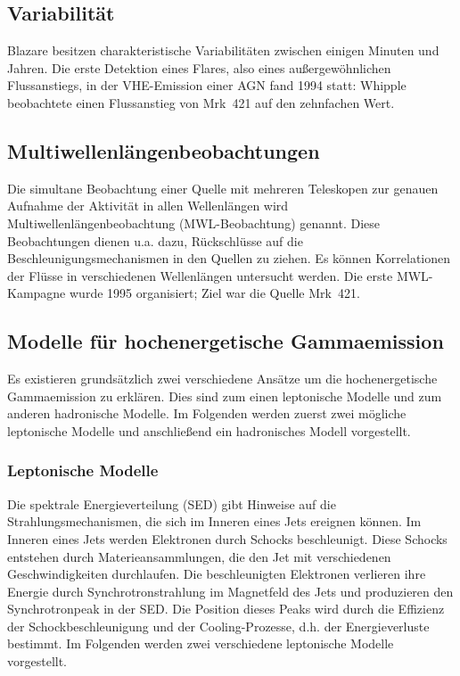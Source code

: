 \subsection{Variabilität}
Blazare besitzen charakteristische Variabilitäten zwischen einigen Minuten und Jahren.
Die erste Detektion eines Flares, also eines außergewöhnlichen Flussanstiegs, in der VHE-Emission einer AGN fand 1994 statt:
Whipple beobachtete einen Flussanstieg von Mrk~421 auf den zehnfachen Wert.\cite{Weekes}\cite{Mrk421_Outburst}

\subsection{Multiwellenlängenbeobachtungen}
Die simultane Beobachtung einer Quelle mit mehreren Teleskopen zur genauen Aufnahme der Aktivität in allen Wellenlängen wird Multiwellenlängenbeobachtung (MWL-Beobachtung) genannt. 
Diese Beobachtungen dienen u.a. dazu, Rückschlüsse auf die Beschleunigungsmechanismen in den Quellen zu ziehen.
Es können Korrelationen der Flüsse in verschiedenen Wellenlängen untersucht werden.
Die erste MWL-Kampagne wurde 1995 organisiert; Ziel war die Quelle Mrk~421.\cite{Weekes}

\subsection{Modelle für hochenergetische Gammaemission}
Es existieren grundsätzlich zwei verschiedene Ansätze um die hochenergetische Gammaemission zu erklären.
Dies sind zum einen leptonische Modelle und zum anderen hadronische Modelle.
Im Folgenden werden zuerst zwei mögliche leptonische Modelle und anschließend ein hadronisches Modell vorgestellt.

\subsubsection{Leptonische Modelle}
Die spektrale Energieverteilung (SED) gibt Hinweise auf die Strahlungsmechanismen, die sich im Inneren eines Jets ereignen können.
Im Inneren eines Jets werden Elektronen durch Schocks beschleunigt. 
Diese Schocks entstehen durch Materieansammlungen, die den Jet mit verschiedenen Geschwindigkeiten durchlaufen.
Die beschleunigten Elektronen verlieren ihre Energie durch Synchrotronstrahlung im Magnetfeld des Jets und produzieren den Synchrotronpeak in der SED.
Die Position dieses Peaks wird durch die Effizienz der Schockbeschleunigung und der Cooling-Prozesse, d.h. der Energieverluste bestimmt. 
Im Folgenden werden zwei verschiedene leptonische Modelle vorgestellt.\cite{Weekes}

